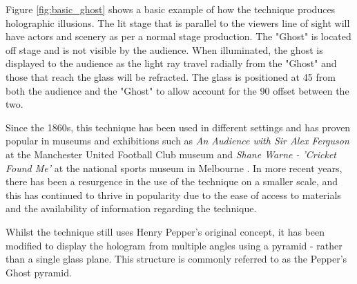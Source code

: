 Figure \ref{fig:basic_ghost} shows a basic example of how the technique produces holographic illusions. The lit stage that is parallel to the viewers line of sight will have actors and scenery as per a normal stage production. The "Ghost" is located off stage and is not visible by the audience. When illuminated, the ghost is displayed to the audience as the light ray travel radially from the "Ghost" and those that reach the glass will be refracted. The glass is positioned at 45\textdegree{} from both the audience and the "Ghost" to allow account for the 90\textdegree{} offset between the two.

Since the 1860s, this technique has been used in different settings and has proven popular in museums and exhibitions such as \textit{An Audience with Sir Alex Ferguson} at the Manchester United Football Club museum \cite{alex_ferguson} and \textit{Shane Warne - 'Cricket Found Me'} at the national sports museum in Melbourne \cite{shane_warne}. In more recent years, there has been a resurgence in the use of the technique on a smaller scale, and this has continued to thrive in popularity due to the ease of access to materials and the availability of information regarding the technique.

Whilst the technique still uses Henry Pepper's original concept, it has been modified to display the hologram from multiple angles using a pyramid - rather than a single glass plane. This structure is commonly referred to as the Pepper's Ghost pyramid.
\begin{figure}[h!]
\end{figure}

